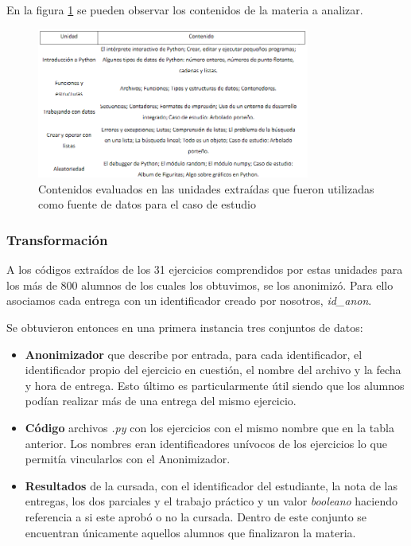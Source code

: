 \documentclass[11pt,a4paper,twoside,openany]{tesis}
\begin{document}
En la figura  \ref{contenidos} se pueden observar  los contenidos de la materia a analizar.

\begin{figure}[H]
    \centering
    \includegraphics[width=0.8\textwidth]{imagenes/modulos-curso.PNG}
    \caption{Contenidos evaluados en las unidades extraídas que fueron utilizadas como fuente de datos para el caso de estudio ~\cite{unsam2020}}
    \label{contenidos}
\end{figure}



\subsubsection{Transformación}\label{sec:normalizacion}  \textbf{ }

A los códigos extraídos de los 31 ejercicios comprendidos por estas unidades para los más de 800 alumnos de los cuales los obtuvimos, se los anonimizó. Para ello asociamos cada entrega con un identificador creado por nosotros, \emph{id\_anon}.

Se obtuvieron entonces en una primera instancia tres conjuntos de datos: 
\begin{itemize}
    \item \textbf{Anonimizador} que describe por entrada, para cada identificador, el identificador propio del ejercicio en cuestión, el nombre del archivo y la fecha y hora de entrega. Esto último es particularmente útil siendo que los alumnos podían realizar más de una entrega del mismo ejercicio.
    \item \textbf{Código} archivos \emph{.py} con los ejercicios con el mismo nombre que en la tabla anterior. Los nombres eran identificadores unívocos de los ejercicios lo que permitía vincularlos con el Anonimizador.
    \item \textbf{Resultados} de la cursada, con el identificador del estudiante, la nota de las entregas, los dos parciales y el trabajo práctico y un valor \emph{booleano} haciendo referencia a si este aprobó o no la cursada. Dentro de este conjunto se encuentran únicamente aquellos alumnos que finalizaron la materia.  
\end{itemize} 
\end{document}
